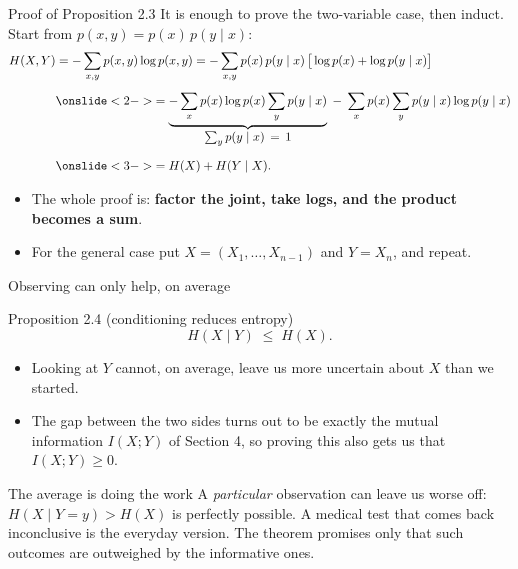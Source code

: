 \documentclass[aspectratio=169,9pt]{beamer}
\newcommand{\blue}[1]{\textcolor{densityblue}{\textbf{#1}}}
\begin{document}
\begin{frame}{Proof of Proposition 2.3}
It is enough to prove the two-variable case, then induct. Start from $p(x,y) = p(x)\,p(y \mid x)$:
\vspace{-0.1cm}
\begin{align*}
    H(X,Y) &= -\sum_{x,y} p(x,y)\log p(x,y)
            = -\sum_{x,y} p(x)\,p(y \mid x)\,\big[\log p(x) + \log p(y \mid x)\big] \\[0.15cm]
           &\onslide<2->{= \underbrace{-\sum_x p(x)\log p(x) \sum_y p(y \mid x)}_{\textstyle \sum_y p(y \mid x) \,=\, 1}
              \;-\; \sum_x p(x) \sum_y p(y \mid x)\log p(y \mid x)} \\[0.2cm]
           &\onslide<3->{= H(X) + H(Y \mid X).}
\end{align*}
\vspace{-0.2cm}
\begin{itemize}
    \item<4-> The whole proof is: \blue{factor the joint, take logs, and the product becomes a sum}.
    \item<5-> For the general case put $X = (X_1,\dots,X_{n-1})$ and $Y = X_n$, and repeat.
\end{itemize}
\end{frame}

\begin{frame}{Observing can only help, on average}
\begin{block}{Proposition 2.4 (conditioning reduces entropy)}
\[
    H(X \mid Y) \;\le\; H(X).
\]
\end{block}
\pause
\vspace{0.1cm}
\begin{itemize}
    \item Looking at $Y$ cannot, on average, leave us more uncertain about $X$ than we started.
    \pause
    \item The gap between the two sides turns out to be exactly the mutual information $I(X;Y)$ of
    Section 4, so proving this also gets us that $I(X;Y) \ge 0$.
\end{itemize}
\vspace{0.25cm}
\pause
\begin{alertblock}{The average is doing the work}
A \textit{particular} observation can leave us worse off: $H(X \mid Y = y) > H(X)$ is perfectly possible.
A medical test that comes back inconclusive is the everyday version. The theorem promises only that such
outcomes are outweighed by the informative ones.
\end{alertblock}
\end{frame}
\end{document}
